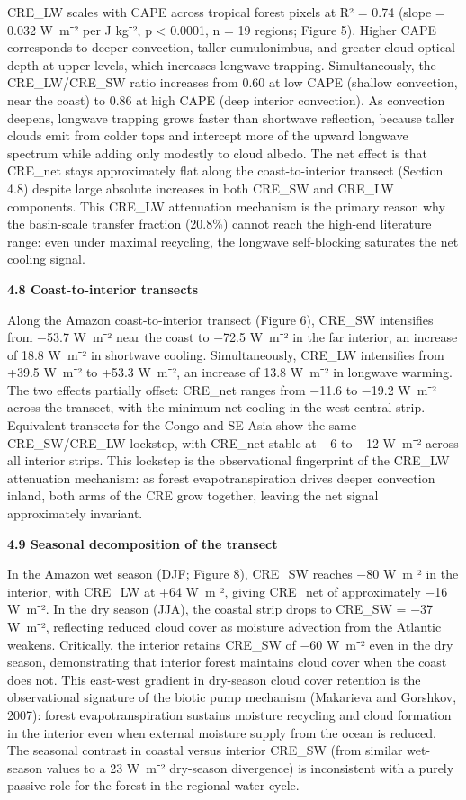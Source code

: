 CRE\_LW scales with CAPE across tropical forest pixels at R² = 0.74
(slope = 0.032 W~m⁻² per J kg⁻², p \textless{} 0.0001, n = 19 regions;
Figure 5). Higher CAPE corresponds to deeper convection, taller
cumulonimbus, and greater cloud optical depth at upper levels, which
increases longwave trapping. Simultaneously, the CRE\_LW/CRE\_SW ratio
increases from 0.60 at low CAPE (shallow convection, near the coast) to
0.86 at high CAPE (deep interior convection). As convection deepens,
longwave trapping grows faster than shortwave reflection, because taller
clouds emit from colder tops and intercept more of the upward longwave
spectrum while adding only modestly to cloud albedo. The net effect is
that CRE\_net stays approximately flat along the coast-to-interior
transect (Section 4.8) despite large absolute increases in both CRE\_SW
and CRE\_LW components. This CRE\_LW attenuation mechanism is the
primary reason why the basin-scale transfer fraction (20.8\%) cannot
reach the high-end literature range: even under maximal recycling, the longwave self-blocking
saturates the net cooling signal.

\textbf{4.8 Coast-to-interior transects}

Along the Amazon coast-to-interior transect (Figure 6), CRE\_SW
intensifies from −53.7 W~m⁻² near the coast to −72.5 W~m⁻² in the far
interior, an increase of 18.8 W~m⁻² in shortwave cooling.
Simultaneously, CRE\_LW intensifies from +39.5 W~m⁻² to +53.3 W~m⁻², an
increase of 13.8 W~m⁻² in longwave warming. The two effects partially
offset: CRE\_net ranges from −11.6 to −19.2 W~m⁻² across the transect,
with the minimum net cooling in the west-central strip. Equivalent
transects for the Congo and SE Asia show the same CRE\_SW/CRE\_LW
lockstep, with CRE\_net stable at −6 to −12 W~m⁻² across all interior
strips. This lockstep is the observational fingerprint of the CRE\_LW
attenuation mechanism: as forest evapotranspiration drives deeper
convection inland, both arms of the CRE grow together, leaving the net
signal approximately invariant.

\textbf{4.9 Seasonal decomposition of the transect}

In the Amazon wet season (DJF; Figure 8), CRE\_SW reaches −80 W~m⁻² in
the interior, with CRE\_LW at +64 W~m⁻², giving CRE\_net of
approximately −16 W~m⁻². In the dry season (JJA), the coastal strip
drops to CRE\_SW = −37 W~m⁻², reflecting reduced cloud cover as moisture
advection from the Atlantic weakens. Critically, the interior retains
CRE\_SW of −60 W~m⁻² even in the dry season, demonstrating that interior
forest maintains cloud cover when the coast does not. This east-west
gradient in dry-season cloud cover retention is the observational
signature of the biotic pump mechanism (Makarieva and Gorshkov, 2007):
forest evapotranspiration sustains moisture recycling and cloud
formation in the interior even when external moisture supply from the
ocean is reduced. The seasonal contrast in coastal versus interior
CRE\_SW (from similar wet-season values to a 23 W~m⁻² dry-season
divergence) is inconsistent with a purely passive role for the forest in
the regional water cycle.

